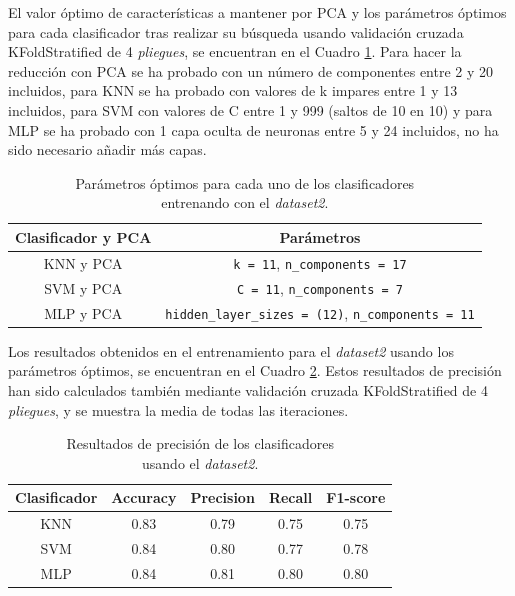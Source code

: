 El valor óptimo de características a mantener por PCA y los parámetros óptimos para cada clasificador tras realizar su búsqueda usando validación cruzada KFoldStratified de 4 \textit{pliegues}, se encuentran en el Cuadro \ref{cuadro:parametros_dataset2}. Para hacer la reducción con PCA se ha probado con un número de componentes entre 2 y 20 incluidos, para KNN se ha probado con valores de k impares entre 1 y 13 incluidos, para SVM con valores de C entre 1 y 999 (saltos de 10 en 10) y para MLP se ha probado con 1 capa oculta de neuronas entre 5 y 24 incluidos, no ha sido necesario añadir más capas.\\

\begin{table}[H]
\begin{center}
\begin{tabular}{|c|c|}
     \hline
    \textbf{Clasificador y PCA} & \textbf{Parámetros} \\
    \hline
     KNN y PCA & \verb|k = 11|, \verb|n_components = 17|\\
     SVM y PCA & \verb|C = 11|, \verb|n_components = 7|\\
     MLP y PCA & \verb|hidden_layer_sizes = (12)|, \verb|n_components = 11|\\
     \hline
 \end{tabular}
 \captionsetup{justification=centering}
\caption{Parámetros óptimos para cada uno de los clasificadores\\
entrenando con el \textit{dataset2}.}
\label{cuadro:parametros_dataset2}
\end{center}
\end{table}

Los resultados obtenidos en el entrenamiento para el \textit{dataset2} usando los parámetros óptimos, se encuentran en el Cuadro \ref{cuadro:resultados_dataset2}. Estos resultados de precisión han sido calculados también mediante validación cruzada KFoldStratified de 4 \textit{pliegues}, y se muestra la media de todas las iteraciones.\\

\begin{table}[H]
\begin{center}
\begin{tabular}{|c|c|c|c|c|}
     \hline
    \textbf{Clasificador} & \textbf{Accuracy} & \textbf{Precision} & \textbf{Recall} & \textbf{F1-score}\\
    \hline
     KNN & 0.83 & 0.79 & 0.75 & 0.75\\
     SVM & 0.84 & 0.80 & 0.77 & 0.78\\
     MLP & 0.84 & 0.81 & 0.80 & 0.80\\
     \hline
 \end{tabular}
 \captionsetup{justification=centering}
\caption{Resultados de precisión de los clasificadores\\
usando el \textit{dataset2}.}
\label{cuadro:resultados_dataset2}
\end{center}
\end{table}

